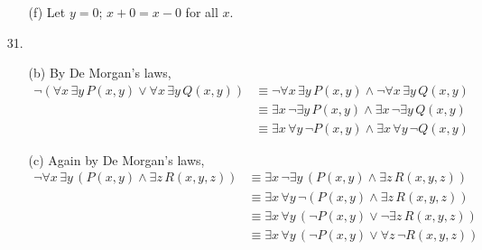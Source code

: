 \documentclass{article}
\begin{document}
\begin{enumerate}
\begin{itemize}
            \item[(f)]  Let $y = 0$; $x + 0 = x - 0$ for all $x$.
        \end{itemize}
    \item[31.]
        \begin{itemize}
            \item[(b)] By De Morgan's laws,
                \begin{align*}
                \neg \left( \forall x \, \exists y \, P(x,y) \lor \forall x \, \exists y \, Q(x,y) \right) &\equiv \neg \forall x \, \exists y \, P(x,y) \land \neg \forall x \, \exists y \, Q(x,y) \\%
                &\equiv \exists x \, \neg \exists y \, P(x,y) \land \exists x \, \neg \exists y \, Q(x,y) \\%
                &\equiv \exists x \, \forall y \, \neg P(x,y) \land \exists x \, \forall y \, \neg Q(x,y) %
                \end{align*}
            \item[(c)] Again by De Morgan's laws,
                \begin{align*}
                \neg \forall x \, \exists y \, \left( P(x,y) \land \exists z \, R(x,y,z) \right) &\equiv \exists x \, \neg \exists y \, \left( P(x,y) \land \exists z \, R(x,y,z) \right) \\
                &\equiv \exists x \, \forall y \, \neg \left( P(x,y) \land \exists z \, R(x,y,z) \right) \\
                &\equiv \exists x \, \forall y \, \left( \neg P(x,y) \lor \neg \exists z \, R(x,y,z) \right) \\
                &\equiv \exists x \, \forall y \, \left( \neg P(x,y) \lor \forall z \, \neg R(x,y,z) \right)
                \end{align*}
        \end{itemize}
\end{enumerate}
\end{document}
